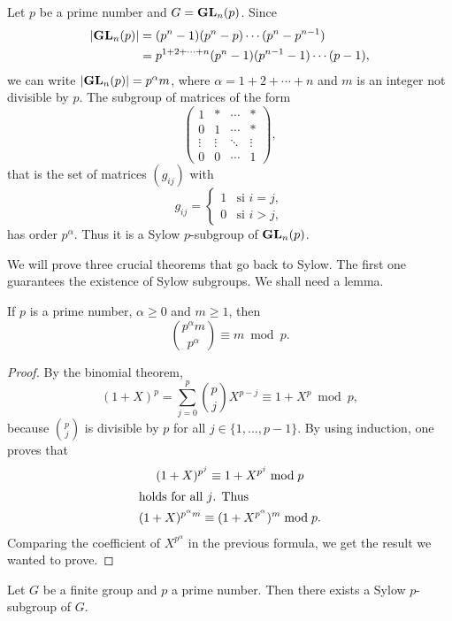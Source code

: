 \begin{example}
Let $p$ be a prime number and 
$G=\mathbf{GL}_n(p)$. Since 
\begin{align*}
|\mathbf{GL}_n(p)|&=(p^n-1)(p^n-p)\cdots (p^n-p^{n-1})\\
&=p^{1+2+\cdots+n}(p^n-1)(p^{n-1}-1)\cdots (p-1),
\end{align*}
we can write $|\mathbf{GL}_n(p)|=p^\alpha m$, where $\alpha=1+2+\cdots+n$ and $m$
is an integer not divisible by $p$. 
The subgroup of matrices of the form 
\[
\begin{pmatrix}
1 & * & \cdots & *\\
0 & 1 & \cdots & *\\
\vdots & \vdots & \ddots & \vdots\\
0 & 0 & \cdots & 1
\end{pmatrix},
\]
that is the set of matrices $(g_{ij})$ with 
\[
g_{ij}=\begin{cases}
1 & \text{si $i=j$},\\
0 & \text{si $i>j$},
\end{cases}
\]
has order $p^\alpha$. Thus it is a Sylow $p$-subgroup of 
$\mathbf{GL}_n(p)$.
\end{example}

We will prove three crucial theorems that go back to Sylow. 
The first one guarantees the existence of Sylow subgroups. 
We shall need a lemma. 

\begin{lemma}
    If $p$ is a prime number, 
    $\alpha\geq0$ and $m\geq 1$, then 
    \[
        \binom{p^\alpha m}{p^\alpha}\equiv m\bmod p.
    \]
\end{lemma}

\begin{proof}
    By the binomial theorem,
        \[
        (1+X)^p=\sum_{j=0}^p\binom{p}{j}X^{p-j}\equiv 1+X^p\bmod p,
        \]
    because $\binom{p}{j}$ is divisible by $p$ for all
    $j\in\{1,\dots,p-1\}$.
    By using induction, one proves that 
        \begin{gather*}
        (1+X)^{p^j}\equiv 1+X^{p^j}\bmod p      \\
        \shortintertext{holds for all $j$. Thus}
        (1+X)^{p^\alpha m}\equiv (1+X^{p^\alpha})^m\bmod p.
        \end{gather*}
Comparing the coefficient of $X^{p^\alpha}$ in the previous
formula, we get the result we wanted to prove.
\end{proof}

\begin{theorem}
\label{thm:Sylow1}
Let $G$ be a finite group and 
$p$ a prime number. Then there exists a Sylow $p$-subgroup of $G$. 
\end{theorem}


